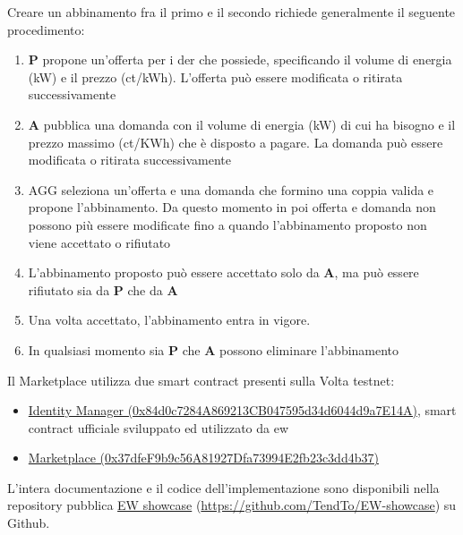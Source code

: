 Creare un abbinamento fra il primo e il secondo richiede generalmente il seguente procedimento:
\begin{enumerate}
    \item \textbf{P} propone un'offerta per i \gls{der} che possiede, specificando il volume di energia (kW) e il prezzo (ct/kWh). L'offerta può essere modificata o ritirata successivamente
    \item \textbf{A} pubblica una domanda con il volume di energia (kW) di cui ha bisogno e il prezzo massimo (ct/KWh) che è disposto a pagare. La domanda può essere modificata o ritirata successivamente
    \item AGG seleziona un'offerta e una domanda che formino una coppia valida e propone l'abbinamento. Da questo momento in poi offerta e domanda non possono più essere modificate fino a quando l'abbinamento proposto non viene accettato o rifiutato
    \item L'abbinamento proposto può essere accettato solo da \textbf{A}, ma può essere rifiutato sia da \textbf{P} che da \textbf{A}
    \item Una volta accettato, l'abbinamento entra in vigore.
    \item In qualsiasi momento sia \textbf{P} che \textbf{A} possono eliminare l'abbinamento
\end{enumerate}

Il Marketplace utilizza due smart contract presenti sulla Volta testnet:
\begin{itemize}
    \item \href{https://volta-explorer.energyweb.org/address/0x84d0c7284A869213CB047595d34d6044d9a7E14A/transactions}{Identity Manager (0x84d0c7284A869213CB047595d34d6044d9a7E14A)}, smart contract ufficiale sviluppato ed utilizzato da \gls{ew}
    \item \href{https://volta-explorer.energyweb.org/address/0x37dfeF9b9c56A81927Dfa73994E2fb23c3dd4b37/transactions}{Marketplace (0x37dfeF9b9c56A81927Dfa73994E2fb23c3dd4b37)}
\end{itemize}

L'intera documentazione e il codice dell'implementazione sono disponibili nella repository pubblica \href{https://github.com/TendTo/EW-showcase}{EW showcase} (\url{https://github.com/TendTo/EW-showcase}) su Github.